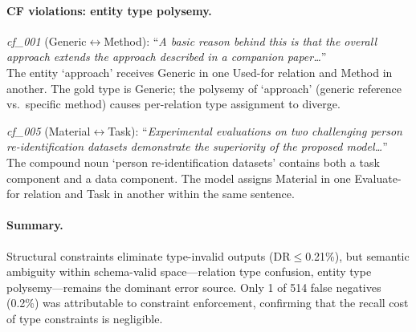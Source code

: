 \paragraph{CF violations: entity type polysemy.}

\noindent\textit{cf\_001} (Generic$\leftrightarrow$Method): ``\textit{A basic reason behind this is that the overall approach extends the approach described in a companion paper\ldots}'' \\
The entity `approach' receives Generic in one Used-for relation and Method in another. The gold type is Generic; the polysemy of `approach' (generic reference vs.\ specific method) causes per-relation type assignment to diverge.

\noindent\textit{cf\_005} (Material$\leftrightarrow$Task): ``\textit{Experimental evaluations on two challenging person re-identification datasets demonstrate the superiority of the proposed model\ldots}'' \\
The compound noun `person re-identification datasets' contains both a task component and a data component. The model assigns Material in one Evaluate-for relation and Task in another within the same sentence.

\paragraph{Summary.}
Structural constraints eliminate type-invalid outputs (DR$\leq$0.21\%), but semantic ambiguity within schema-valid space---relation type confusion, entity type polysemy---remains the dominant error source. Only 1 of 514 false negatives (0.2\%) was attributable to constraint enforcement, confirming that the recall cost of type constraints is negligible.
